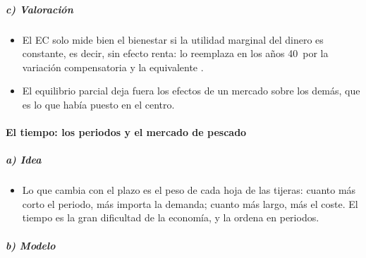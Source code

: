 \documentclass[11pt]{article}
\begin{document}
\subparagraph{c) Valoración}

\begin{itemize}
\item El EC solo mide bien el bienestar si la utilidad marginal del dinero es constante, es decir, sin efecto renta:  lo reemplaza en los años 40~por la variación compensatoria y la equivalente .
\item El equilibrio parcial deja fuera los efectos de un mercado sobre los demás, que es lo que  había puesto en el centro.
\end{itemize}

\paragraph{El tiempo: los periodos y el mercado de pescado}

\subparagraph{a) Idea}

\begin{itemize}
\item Lo que cambia con el plazo es el peso de cada hoja de las tijeras: cuanto más corto el periodo, más importa la demanda; cuanto más largo, más el coste\nocite{Marshall1890Principles}. El tiempo es la gran dificultad de la economía, y  la ordena en periodos.
\end{itemize}

\subparagraph{b) Modelo}
\end{document}

